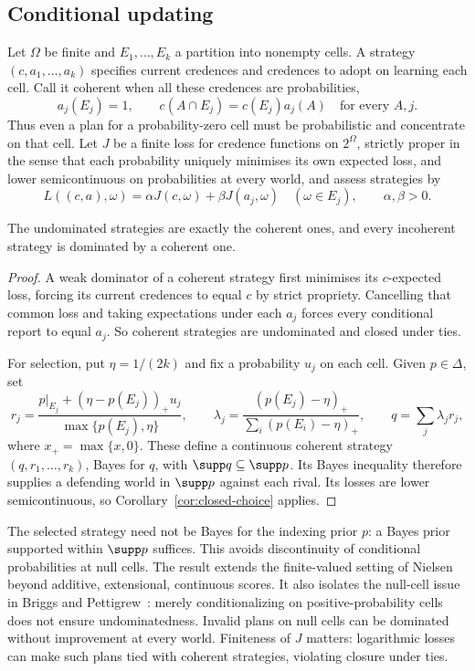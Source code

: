 \subsection{Conditional updating}
Let $\Omega$ be finite and $E_1,\ldots,E_k$ a partition into nonempty cells. A strategy $(c,a_1,\ldots,a_k)$ specifies current credences and credences to adopt on learning each cell. Call it coherent when all these credences are probabilities,
\[
a_j(E_j)=1,\qquad c(A\cap E_j)=c(E_j)a_j(A)\quad\text{for every }A,j.
\]
Thus even a plan for a probability-zero cell must be probabilistic and concentrate on that cell. Let $J$ be a finite loss for credence functions on $2^\Omega$, strictly proper in the sense that each probability uniquely minimises its own expected loss, and lower semicontinuous on probabilities at every world, and assess strategies by
\[
L((c,a),\omega)=\alpha J(c,\omega)+\beta J(a_j,\omega)
\quad(\omega\in E_j),\qquad \alpha,\beta>0.
\]
\begin{proposition}\label{prop:short-updating}
The undominated strategies are exactly the coherent ones, and every incoherent strategy is dominated by a coherent one.
\end{proposition}
\begin{proof}
A weak dominator of a coherent strategy first minimises its $c$-expected loss, forcing its current credences to equal $c$ by strict propriety. Cancelling that common loss and taking expectations under each $a_j$ forces every conditional report to equal $a_j$. So coherent strategies are undominated and closed under ties.

For selection, put $\eta=1/(2k)$ and fix a probability $u_j$ on each cell. Given $p\in\Delta$, set
\[
r_j=\frac{p|_{E_j}+(\eta-p(E_j))_+u_j}{\max\{p(E_j),\eta\}},\qquad
\lambda_j=\frac{(p(E_j)-\eta)_+}{\sum_i(p(E_i)-\eta)_+},\qquad
q=\sum_j\lambda_jr_j,
\]
where $x_+=\max\{x,0\}$. These define a continuous coherent strategy $(q,r_1,\ldots,r_k)$, Bayes for $q$, with $\supp q\subseteq\supp p$. Its Bayes inequality therefore supplies a defending world in $\supp p$ against each rival. Its losses are lower semicontinuous, so Corollary~\ref{cor:closed-choice} applies.
\end{proof}
The selected strategy need not be Bayes for the indexing prior $p$: a Bayes prior supported within $\supp p$ suffices. This avoids discontinuity of conditional probabilities at null cells. The result extends the finite-valued setting of Nielsen~\cite{Nielsen21} beyond additive, extensional, continuous scores. It also isolates the null-cell issue in Briggs and Pettigrew~\cite{BP20}: merely conditionalizing on positive-probability cells does not ensure undominatedness. Invalid plans on null cells can be dominated without improvement at every world. Finiteness of $J$ matters: logarithmic losses can make such plans tied with coherent strategies, violating closure under ties.

